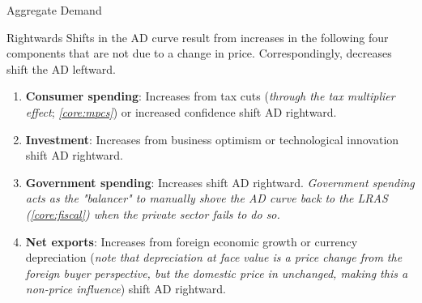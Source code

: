 \documentclass[10pt]{article}
\begin{document}
\begin{core}{Aggregate Demand}
\begin{enumerate}
      \end{enumerate}

      Rightwards Shifts in the AD curve result from increases in the following four components that are not due to a change in price. Correspondingly, decreases shift the AD leftward.

      \begin{enumerate}

        \item \textbf{Consumer spending}: Increases from tax cuts (\textit{through the tax multiplier effect}; \textit{\autoref{core:mpcs}}) or increased confidence shift AD rightward.

        \item \textbf{Investment}: Increases from business optimism or technological innovation shift AD rightward.

        \item \textbf{Government spending}: Increases shift AD rightward. \textit{Government spending acts as the "balancer" to manually shove the AD curve back to the LRAS (\textit{\autoref{core:fiscal}}) when the private sector fails to do so.}

        \item \textbf{Net exports}: Increases from foreign economic growth or currency depreciation (\textit{note that depreciation at face value is a price change from the foreign buyer perspective, but the domestic price in unchanged, making this a non-price influence}) shift AD rightward.

      \end{enumerate}

    \end{core}
\end{document}

